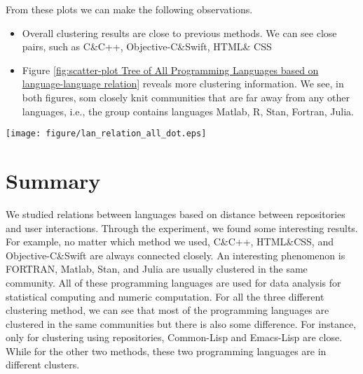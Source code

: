 \documentclass[12pt,oneside,final]{vlsithesis}
\begin{document}
From these plots we can make the following observations.

\begin{itemize}
\item   Overall clustering results are close to previous methods. We can see close pairs, such as  C\&C++, Objective-C\&Swift, HTML\& CSS 
\item Figure \ref{fig:scatter-plot  Tree of All Programming Languages based on language-language relation} reveals more clustering information. We see, in both figures,  som closely knit communities that are far away from any other languages, i.e., the group contains languages Matlab, R, Stan, Fortran, Julia.
\end{itemize}

\begin{figure*}
	\centering
		\texttt{[image: figure/lan\_relation\_all\_dot.eps]}
	\caption{Scatter plot of two dimensional vectors of programming languages generated by t-SNE. Repository-repository proximity matrix is generated using dot product-idf weight}
	\label{fig:scatter-plot  Tree of All Programming Languages based on language-language relation}
\end{figure*}

\section{Summary}
We studied relations between languages based on distance between repositories and user interactions. Through the experiment, we found some interesting results. For example, no matter which method we used, C\&C++, HTML\&CSS, and Objective-C\&Swift are always connected closely. An interesting phenomenon is FORTRAN, Matlab, Stan, and Julia are usually clustered in the same community. All of these programming languages are used for data analysis for statistical computing and numeric computation. For all the three different clustering method, we can see that most of the programming languages are clustered in the same communities but there is also some difference. For instance, only for clustering using repositories, Common-Lisp and Emacs-Lisp are close. While for the other two methods, these two programming languages are in different clusters.
\end{document}

